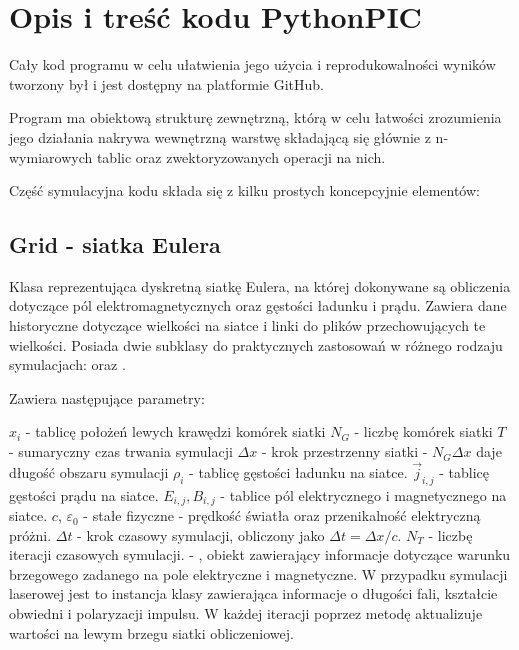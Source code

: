 \section{Opis i treść kodu PythonPIC}
Cały kod programu w celu ułatwienia jego użycia i reprodukowalności wyników tworzony był i jest
dostępny na platformie GitHub\cite{github-repo}.

Program ma obiektową strukturę zewnętrzną, którą w celu łatwości
zrozumienia jego działania nakrywa wewnętrzną warstwę składającą się
głównie z n-wymiarowych tablic  oraz zwektoryzowanych
operacji na nich.

Część symulacyjna kodu składa się z kilku prostych koncepcyjnie elementów:

\subsection{Grid - siatka Eulera}
Klasa reprezentująca dyskretną siatkę Eulera, na której dokonywane są
obliczenia dotyczące pól elektromagnetycznych oraz gęstości ładunku i
prądu. Zawiera dane historyczne dotyczące wielkości na siatce
i linki do plików  przechowujących te wielkości.
Posiada dwie subklasy do praktycznych zastosowań w różnego rodzaju
symulacjach:  oraz .

Zawiera następujące parametry:
\begin{itemize}
    \itemi $x_i$ - tablicę położeń lewych krawędzi komórek siatki
    \itemi $N_G$ - liczbę komórek siatki
    \itemi $T$ - sumaryczny czas trwania symulacji
    \itemi $\Delta x$ - krok przestrzenny siatki - $N_G \Delta x$ daje
        długość obszaru symulacji
    \itemi $\rho_i$ - tablicę gęstości ładunku na siatce.
    \itemi $\vec{j}_{i,j}$ - tablicę gęstości prądu na siatce.
    \itemi $E_{i,j}, B_{i,j}$ - tablice pól elektrycznego i magnetycznego na siatce.
    \itemi $c$, $\varepsilon_0$ - stałe fizyczne - prędkość światła oraz
        przenikalność elektryczną próżni.
    \itemi $\Delta t$ - krok czasowy symulacji, obliczony jako $\Delta t =
        \Delta x / c$.
    \itemi $N_T$ - liczbę iteracji czasowych symulacji.
    \itemi {} - , obiekt zawierający informacje dotyczące
        warunku brzegowego zadanego na pole elektryczne i magnetyczne. W przypadku symulacji
        laserowej jest to instancja klasy  zawierająca informacje o
        długości fali, kształcie obwiedni
        i polaryzacji impulsu. W każdej iteracji  poprzez metodę
         aktualizuje wartości na lewym brzegu siatki obliczeniowej.
\end{itemize}

